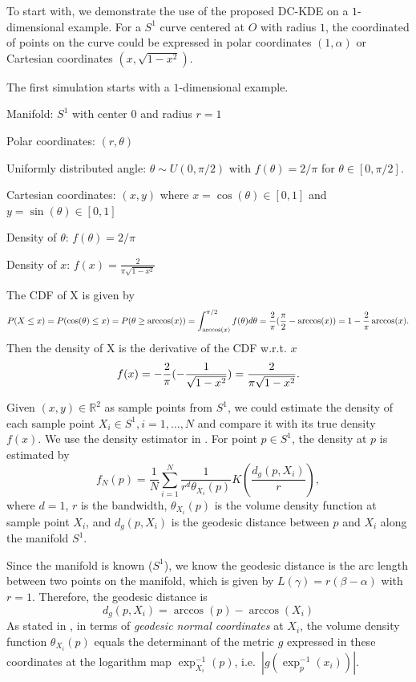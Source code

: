\documentclass[11pt,a4paper,]{article}
\begin{document}
To start with, we demonstrate the use of the proposed DC-KDE on a \(1\)-dimensional example. For a \(S^1\) curve centered at \(O\) with radius \(1\), the coordinated of points on the curve could be expressed in polar coordinates \((1, \alpha)\) or Cartesian coordinates \((x, \sqrt{1-x^2})\).

The first simulation starts with a \(1\)-dimensional example.

Manifold: \(S^1\) with center 0 and radius \(r=1\)

Polar coordinates: \((r, \theta)\)

Uniformly distributed angle: \(\theta \sim U(0, \pi/2)\) with \(f(\theta) = 2 / \pi\) for \(\theta \in [0, \pi /2]\).

Cartesian coordinates: \((x, y)\) where \(x = \cos(\theta) \in [0, 1]\) and \(y = \sin(\theta) \in [0, 1]\)

Density of \(\theta\): \(f(\theta) = 2 / \pi\)

Density of \(x\): \(f(x) = \frac{2}{\pi \sqrt{1-x^2}}\)

The CDF of X is given by
\[
P(X \leq x) = P(\cos(\theta) \leq x) \\
= P(\theta \geq \arccos(x)) \\
= \int_{\arccos(x)}^{\pi/2} f(\theta) d\theta \\
=  \frac{2}{\pi} (\frac{\pi}{2} - \arccos(x) ) \\
= 1 - \frac{2}{\pi} \arccos(x).
\]
Then the density of X is the derivative of the CDF w.r.t. \(x\) \[
f(x) = -\frac{2}{\pi} (-\frac{1}{\sqrt{1 - x^2}}) \\
= \frac{2}{\pi \sqrt{1 - x^2}}.
\]

Given \((x, y) \in \mathbb{R}^2\) as sample points from \(S^1\), we could
estimate the density of each sample point \(X_i \in S^1, i = 1, \dots, N\)
and compare it with its true density \(f(x)\).
We use the density estimator in \textcite{Pelletier2005-vu}. For point \(p \in S^1\), the density at \(p\) is estimated by
\[
f_N(p) = \frac{1}{N} \sum_{i=1}^{N} \frac{1}{r^d \theta_{X_i}(p)} K(\frac{d_g(p, X_i)}{r}),
\]
where \(d=1\), \(r\) is the bandwidth, \(\theta_{X_i}(p)\) is the volume density function at sample point \(X_i\), and \(d_g(p, X_i)\) is the geodesic distance between \(p\) and \(X_i\) along the manifold \(S^1\).

Since the manifold is known (\(S^1\)), we know the geodesic distance is the arc length between two points on the manifold, which is given by \(L(\gamma) = r(\beta - \alpha)\) with \(r=1\). Therefore, the geodesic distance is
\[
d_g(p, X_i) = \arccos(p) - \arccos(X_i)
\]
As stated in \textcite{Pelletier2005-vu}, in terms of \emph{geodesic normal coordinates} at \(X_i\), the volume density function \(\theta_{X_i}(p)\) equals the determinant of the metric \(g\) expressed in these coordinates at the logarithm map \(\exp_{X_i}^{-1}(p)\), i.e.~\(|g(\exp_p^{-1}(x_i))|\).
\end{document}
